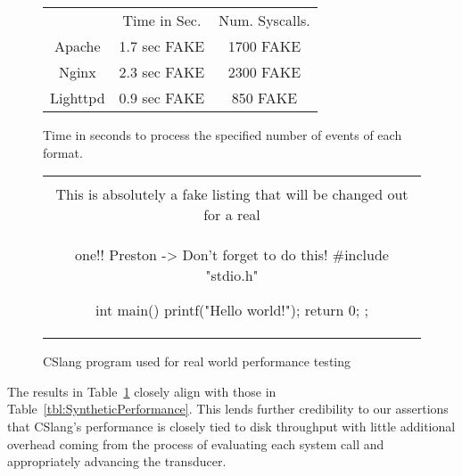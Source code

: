 \begin{figure}
  \begin{tabular}{|c|c|c}
                & Time in Sec. & Num. Syscalls.\\
  Apache        & 1.7 sec FAKE & 1700 FAKE      \\
  Nginx         & 2.3 sec FAKE & 2300 FAKE      \\
  Lighttpd      & 0.9 sec FAKE & 850  FAKE      \\
\end{tabular}
\caption{Time in seconds to process the specified number of events of each format.}
\label{tbl:RealWorldPerformance}
\end{figure}

\begin{figure}[H]
\centering
\begin{tabular}{c}
\begin{lstlisting}
\\ This is absolutely a fake listing that will be changed out for a real
\\ one!!  Preston -> Don't forget to do this!
#include "stdio.h"

int main() {
    printf("Hello world!\n");
    return 0;
};
\end{lstlisting}
\end{tabular}
\caption{CSlang program used for real world performance testing}
\label{lst:RealWorldPerformance}
\end{figure}

The results in Table~\ref{tbl:RealWorldPerformance} closely align with
those in Table~\ref{tbl:SyntheticPerformance}.  This lends further
credibility to our assertions that CSlang's performance is closely tied to
disk throughput with little additional overhead coming from the process of
evaluating each system call and appropriately advancing the transducer.

